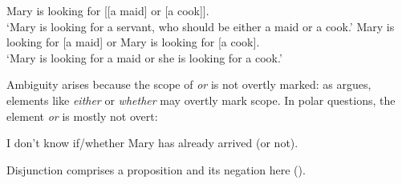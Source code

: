 \ea
\ea Mary is looking for [[a maid] or [a cook]].\\
`Mary is looking for a servant, who should be either a maid or a cook.'
\ex Mary is looking for [a maid] or Mary is looking for [a cook].\\
`Mary is looking for a maid or she is looking for a cook.'
\z
\z

Ambiguity arises because the scope of \textit{or} is not overtly marked: as \citet{larson1985nllt} argues, elements like \textit{either} or \textit{whether} may overtly mark scope. In polar questions, the element \textit{or} is mostly not overt:

\ea I don't know if/whether Mary has already arrived (or not).
\z

Disjunction comprises a proposition and its negation here (\citealt[225--227]{larson1985nllt}). 


